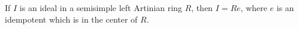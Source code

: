 If $I$ is an ideal in a semisimple left Artinian ring $R$, then $I = Re$, where $e$ is an idempotent which is in the center of $R$.
